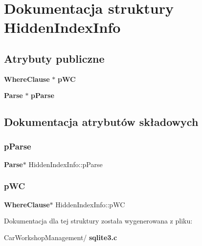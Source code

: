 \section{Dokumentacja struktury Hidden\+Index\+Info}
\label{struct_hidden_index_info}
\subsection*{Atrybuty publiczne}
\begin{DoxyCompactItemize}
\item 
\textbf{ Where\+Clause} $\ast$ \textbf{ p\+WC}
\item 
\textbf{ Parse} $\ast$ \textbf{ p\+Parse}
\end{DoxyCompactItemize}


\subsection{Dokumentacja atrybutów składowych}
\mbox{\label{struct_hidden_index_info_a2a9e6e808d13c30cfba3e97e3729e8f5}} 
\subsubsection{pParse}
{\footnotesize\ttfamily \textbf{ Parse}$\ast$ Hidden\+Index\+Info\+::p\+Parse}

\mbox{\label{struct_hidden_index_info_adb5370f1011f7a754e8cd88913147f24}} 
\subsubsection{pWC}
{\footnotesize\ttfamily \textbf{ Where\+Clause}$\ast$ Hidden\+Index\+Info\+::p\+WC}



Dokumentacja dla tej struktury została wygenerowana z pliku\+:\begin{DoxyCompactItemize}
\item 
Car\+Workshop\+Management/\textbf{ sqlite3.\+c}\end{DoxyCompactItemize}
